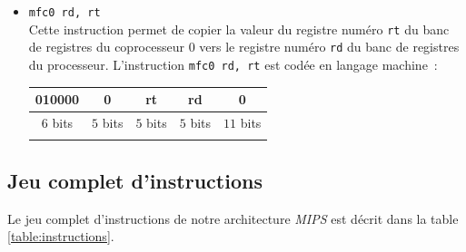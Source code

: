 \documentclass[12pt]{article}
\begin{document}
\begin{itemize}
\item \verb+mfc0 rd, rt+\\
Cette instruction permet de copier la valeur du registre numéro \verb+rt+ du banc de registres du coprocesseur $0$ vers le registre
numéro \verb+rd+ du banc de registres du processeur.
L'instruction \verb+mfc0 rd, rt+ est codée en langage machine~:\\
\begin{center}
\begin{tabular}{ccccc}
\hline
\multicolumn{1}{|c}{010000} & \multicolumn{1}{|c}{0} & \multicolumn{1}{|c}{rt} & \multicolumn{1}{|c}{rd} & \multicolumn{1}{|c|}{0} \\
\hline
$6$ bits & $5$ bits & $5$ bits & $5$ bits & $11$ bits\\
&&&&\\
\end{tabular}
\end{center}

\end{itemize}

\subsection{Jeu complet d'instructions}

Le jeu complet d'instructions de notre architecture \emph{MIPS} est décrit dans la table \ref{table:instructions}.
\end{document}
